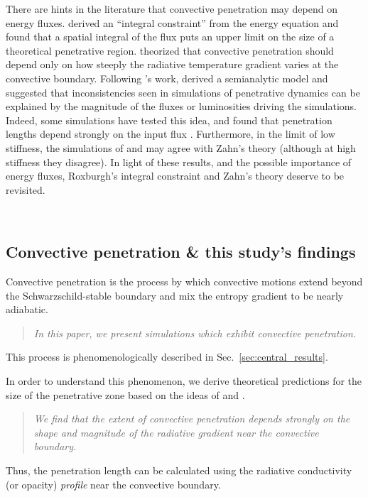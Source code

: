 \documentclass[twocolumn]{aastex631}
\begin{document}
There are hints in the literature that convective penetration may depend on energy fluxes.
\citet{roxburgh1978, roxburgh1989, roxburgh1992, roxburgh1998} derived an ``integral constraint'' from the energy equation and found that a spatial integral of the flux puts an upper limit on the size of a theoretical penetrative region.
\citet{zahn1991} theorized that convective penetration should depend only on how steeply the radiative temperature gradient varies at the convective boundary.
Following \citet{zahn1991}'s work, \citet{rempel2004} derived a semianalytic model and suggested that inconsistencies seen in simulations of penetrative dynamics can be explained by the magnitude of the fluxes or luminosities driving the simulations.
Indeed, some simulations have tested this idea, and found that penetration lengths depend strongly on the input flux \citep{singh_etal_1998, kapyla_etal_2007, tian_etal_2009, hotta2017, kapyla2019}.
Furthermore, in the limit of low stiffness, the simulations of \citet{hurlburt_etal_1994} and \citet{rogers_glatzmaier_2005} may agree with Zahn's theory (although at high stiffness they disagree).
In light of these results, and the possible importance of energy fluxes, Roxburgh's integral constraint and Zahn's theory deserve to be revisited.


$\,$
\subsection{Convective penetration \& this study's findings}

Convective penetration is the process by which convective motions extend beyond the Schwarzschild-stable boundary and mix the entropy gradient to be nearly adiabatic.
\begin{quote}
\emph{
In this paper, we present simulations which exhibit convective penetration.
}
\end{quote}
This process is phenomenologically described in Sec.~\ref{sec:central_results}.

In order to understand this phenomenon, we derive theoretical predictions for the size of the penetrative zone based on the ideas of \citet{roxburgh1989} and \citet{zahn1991}.
\begin{quote}
\emph{
We find that the extent of convective penetration depends strongly on the shape and magnitude of the radiative gradient near the convective boundary.
}
\end{quote}
Thus, the penetration length can be calculated using the radiative conductivity (or opacity) \emph{profile} near the convective boundary.
\end{document}
